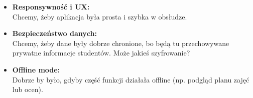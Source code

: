 \begin{itemize}
	\newpage

	\item \textbf{Responsywność i UX:}
	      \\Chcemy, żeby aplikacja była prosta i szybka w obsłudze.
	\item \textbf{Bezpieczeństwo danych: }
	      \\Chcemy, żeby dane były dobrze chronione, bo będą tu przechowywane prywatne informacje studentów. Może jakieś szyfrowanie?
	\item \textbf{Offline mode: }
	      \\Dobrze by było, gdyby część funkcji działała offline (np. podgląd planu zajęć lub ocen).
\end{itemize}
